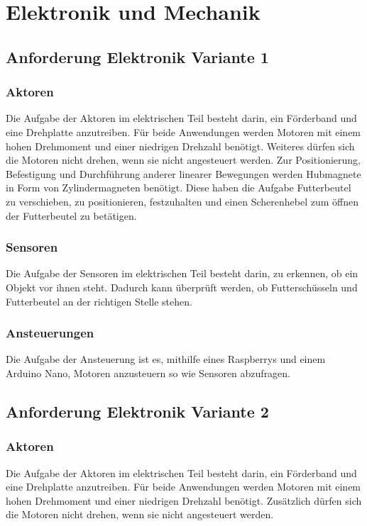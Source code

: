 \chapter{Elektronik und Mechanik}
\label{sec:elektronik-und-mechanik}

\section{Anforderung Elektronik Variante 1}
\subsection{Aktoren}
Die Aufgabe der Aktoren im elektrischen Teil besteht darin, ein Förderband und eine Drehplatte anzutreiben. Für beide Anwendungen werden Motoren mit einem hohen Drehmoment und einer niedrigen Drehzahl benötigt. Weiteres dürfen sich die Motoren nicht drehen, wenn sie nicht angesteuert werden.
Zur Positionierung, Befestigung und Durchführung anderer linearer Bewegungen werden Hubmagnete in Form von Zylindermagneten benötigt. Diese haben die Aufgabe Futterbeutel zu verschieben, zu positionieren, festzuhalten und einen Scherenhebel zum öffnen der Futterbeutel zu betätigen.  
\subsection{Sensoren}
Die Aufgabe der Sensoren im elektrischen Teil besteht darin, zu erkennen, ob ein Objekt vor ihnen steht. Dadurch kann überprüft werden, ob Futterschüsseln und Futterbeutel an der richtigen Stelle stehen.
\subsection{Ansteuerungen}
Die Aufgabe der Ansteuerung ist es, mithilfe eines Raspberrys und einem Arduino Nano, Motoren anzusteuern so wie Sensoren abzufragen. 
\newpage

\section{Anforderung Elektronik Variante 2}
\subsection{Aktoren}
Die Aufgabe der Aktoren im elektrischen Teil besteht darin, ein Förderband und eine Drehplatte anzutreiben. Für beide Anwendungen werden Motoren mit einem hohen Drehmoment und einer niedrigen Drehzahl benötigt. Zusätzlich dürfen sich die Motoren nicht drehen, wenn sie nicht angesteuert werden.
